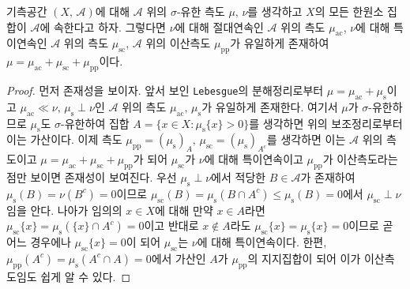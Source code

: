 \begin{theorem}
    기측공간 $(X,\,\mathcal{A})$에 대해 $\mathcal{A}$ 위의 $\sigma$-유한 측도 $\mu,\,\nu$를 생각하고 $X$의 모든 한원소 집합이 $\mathcal{A}$에 속한다고 하자. 그렇다면 $\nu$에 대해 절대연속인 $\mathcal{A}$ 위의 측도 $\mu_\mathrm{ac}$, $\nu$에 대해 특이연속인 $\mathcal{A}$ 위의 측도 $\mu_\mathrm{sc}$, $\mathcal{A}$ 위의 이산측도 $\mu_\mathrm{pp}$가 유일하게 존재하여 $\mu=\mu_\mathrm{ac}+\mu_\mathrm{sc}+\mu_\mathrm{pp}$이다.
\end{theorem}

\begin{proof}
    먼저 존재성을 보이자. 앞서 보인 \texttt{Lebesgue}의 분해정리로부터 $\mu=\mu_\mathrm{ac}+\mu_\mathrm{s}$이고 $\mu_\mathrm{ac}\ll\nu,\,\mu_\mathrm{s}\perp\nu$인 $\mathcal{A}$ 위의 측도 $\mu_\mathrm{ac},\,\mu_\mathrm{s}$가 유일하게 존재한다. 여기서 $\mu$가 $\sigma$-유한하므로 $\mu_\mathrm{s}$도 $\sigma$-유한하여 집합 $A=\{x\in X:\mu_\mathrm{s}\{x\}>0\}$를 생각하면 위의 보조정리로부터 이는 가산이다. 이제 측도 $\mu_\mathrm{pp}=(\mu_\mathrm{s})_A,\,\mu_\mathrm{sc}=(\mu_\mathrm{s})_{A^c}$를 생각하면 이는 $\mathcal{A}$ 위의 측도이고 $\mu=\mu_\mathrm{ac}+\mu_\mathrm{sc}+\mu_\mathrm{pp}$가 되어 $\mu_\mathrm{sc}$가 $\nu$에 대해 특이연속이고 $\mu_\mathrm{pp}$가 이산측도라는 점만 보이면 존재성이 보여진다. 우선 $\mu_\mathrm{s}\perp\nu$에서 적당한 $B\in\mathcal{A}$가 존재하여 $\mu_\mathrm{s}(B)=\nu(B^c)=0$이므로 $\mu_\mathrm{sc}(B)=\mu_\mathrm{s}(B\cap A^c)\leq\mu_\mathrm{s}(B)=0$에서 $\mu_\mathrm{sc}\perp\nu$임을 안다. 나아가 임의의 $x\in X$에 대해 만약 $x\in A$라면 $\mu_\mathrm{sc}\{x\}=\mu_\mathrm{s}(\{x\}\cap A^c)=0$이고 반대로 $x\notin A$라도 $\mu_\mathrm{sc}\{x\}=\mu_\mathrm{s}\{x\}=0$이므로 곧 어느 경우에나 $\mu_\mathrm{sc}\{x\}=0$이 되어 $\mu_\mathrm{sc}$는 $\nu$에 대해 특이연속이다. 한편, $\mu_\mathrm{pp}(A^c)=\mu_\mathrm{s}(A^c\cap A)=0$에서 가산인 $A$가 $\mu_\mathrm{pp}$의 지지집합이 되어 이가 이산측도임도 쉽게 알 수 있다.


\end{proof}

